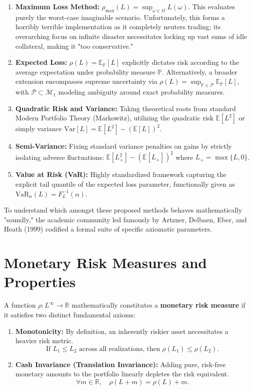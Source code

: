 \begin{enumerate}
    \item \textbf{Maximum Loss Method:} $\rho_{\max}(L) = \sup_{\omega \in \Omega} L(\omega)$. This evaluates purely the worst-case imaginable scenario. Unfortunately, this forms a horribly terrible implementation as it completely neuters trading; its overarching focus on infinite disaster necessitates locking up vast sums of idle collateral, making it "too conservative."
    \item \textbf{Expected Loss:} $\rho(L) = \mathbb{E}_{\mathbb{P}}[L]$ explicitly dictates risk according to the average expectation under probability measure $\mathbb{P}$. Alternatively, a broader extension encompasses supreme uncertainty via $\rho(L) = \sup_{\mathbb{P} \in \mathcal{P}} \mathbb{E}_{\mathbb{P}}[L]$, with $\mathcal{P} \subset \mathcal{M}_1$ modeling ambiguity around exact probability measures.
    \item \textbf{Quadratic Risk and Variance:} Taking theoretical roots from standard Modern Portfolio Theory (Markowitz), utilizing the quadratic risk $\mathbb{E}[L^2]$ or simply variance $\text{Var}[L] = \mathbb{E}[L^2] - (\mathbb{E}[L])^2$.
    \item \textbf{Semi-Variance:} Fixing standard variance penalties on gains by strictly isolating adverse fluctuations: $\mathbb{E}[L_+^2] - (\mathbb{E}[L_+])^2$ where $L_+ = \max\{L, 0\}$.
    \item \textbf{Value at Risk (VaR):} Highly standardized framework capturing the explicit tail quantile of the expected loss parameter, functionally given as $\text{VaR}_\alpha(L) = F_L^{-1}(\alpha)$.
\end{enumerate}

To understand which amongst these proposed methods behaves mathematically "soundly," the academic community led famously by Artzner, Delbaen, Eber, and Heath (1999) codified a formal suite of specific axiomatic parameters.

\section{Monetary Risk Measures and Properties}

\begin{definition}
A function $\rho: L^\infty \to \mathbb{R}$ mathematically constitutes a \textbf{monetary risk measure} if it satisfies two distinct fundamental axioms:

\begin{enumerate}
    \item \textbf{Monotonicity:} By definition, an inherently riskier asset necessitates a heavier risk metric.
    $$
    \text{If } L_1 \leq L_2 \text{ across all realizations, then } \rho(L_1) \leq \rho(L_2).
    $$
    \item \textbf{Cash Invariance (Translation Invariance):} Adding pure, risk-free monetary amounts to the portfolio linearly depletes the risk equivalent.
    $$
    \forall m \in \mathbb{R}, \quad \rho(L + m) = \rho(L) + m.
    $$
\end{enumerate}
\end{definition}

